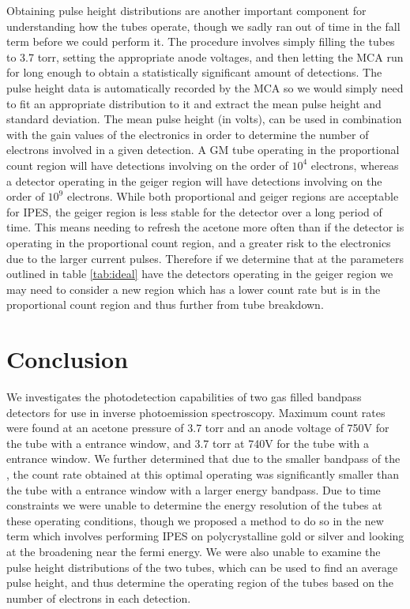 Obtaining pulse height distributions are another important component for understanding how the tubes operate, though we sadly ran out of time in the fall term before we could perform it.
The procedure involves simply filling the tubes to 3.7 torr, setting the appropriate anode voltages, and then letting the MCA run for long enough to obtain a statistically significant amount 
of detections. The pulse height data is automatically recorded by the MCA so we would simply need to fit an appropriate distribution to it and extract the mean pulse height and standard deviation. 
The mean pulse height (in volts), can be used in combination with the gain values of the electronics in order to determine the number of electrons involved in a given detection. A 
GM tube operating in the proportional count region will have detections involving on the order of $10^4$ electrons, whereas a detector operating in the geiger region will have 
detections involving on the order of $10^9$ electrons\cite{knoll2010radiation}. While both proportional and geiger regions are acceptable for IPES, the geiger region is less stable 
for the detector over a long period of time. This means needing to refresh the acetone more often than if the detector is operating in the proportional count region, and a greater 
risk to the electronics due to the larger current pulses. Therefore if we determine that at the parameters outlined in table \ref{tab:ideal} have the detectors operating in the 
geiger region we may need to consider a new region which has a lower count rate but is in the proportional count region and thus further from tube breakdown. 

\section{Conclusion}
We investigates the photodetection capabilities of two gas filled bandpass detectors for use in inverse photoemission spectroscopy. Maximum count rates were found at an acetone 
pressure of 3.7 torr and an anode voltage of 750V for the tube with a  entrance window, and 3.7 torr at 740V for the tube with a  entrance window. We further determined
that due to the smaller bandpass of the , the count rate obtained at this optimal operating was significantly smaller than the tube with a  entrance window with a 
larger energy bandpass. Due to time constraints we were unable to determine the energy resolution of the tubes at these operating conditions, though we proposed a method to do so 
in the new term which involves performing IPES on polycrystalline gold or silver and looking at the broadening near the fermi energy. We were also unable to examine the pulse height 
distributions of the two tubes, which can be used to find an average pulse height, and thus determine the operating region of the tubes based on the number of electrons in each detection. 


